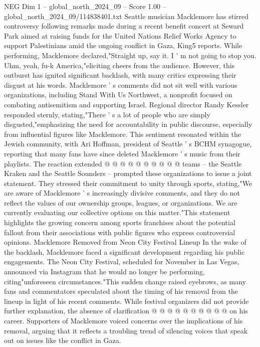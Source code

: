 \begin{textsample}{NEG Dim 1 – global\_north\_2024\_09 – Score 1.00 – global\_north\_2024\_09/114838401.txt}  \label{ex:f1_neg_362}
Seattle musician Macklemore has stirred controversy following remarks made during a recent benefit concert at Seward Park aimed at raising funds for the United Nations Relief Works Agency to support Palestinians amid the ongoing conflict in Gaza, King5 reports.
While performing, Macklemore declared,"Straight up, say it.
I ' m not going to stop you.
Uhm, yeah, fu-k America,"eliciting cheers from the audience.
However, this outburst has ignited significant backlash, with many critics expressing their disgust at his words.
Macklemore ' s comments did not sit well with various organizations, including Stand With Us Northwest, a nonprofit focused on combating antisemitism and supporting Israel.
Regional director Randy Kessler responded sternly, stating,"There ' s a lot of people who are simply disgusted,"emphasizing the need for accountability in public discourse, especially from influential figures like Macklemore.
This sentiment resonated within the Jewish community, with Ari Hoffman, president of Seattle ' s BCHM synagogue, reporting that many fans have since deleted Macklemore ' s music from their playlists.
The reaction extended @ @ @ @ @ @ @ @ @ @ teams -- the Seattle Kraken and the Seattle Sounders -- prompted these organizations to issue a joint statement.
They stressed their commitment to unity through sports, stating,"We are aware of Macklemore ' s increasingly divisive comments, and they do not reflect the values of our ownership groups, leagues, or organizations.
We are currently evaluating our collective options on this matter."This statement highlights the growing concern among sports franchises about the potential fallout from their associations with public figures who express controversial opinions.
Macklemore Removed from Neon City Festival Lineup In the wake of the backlash, Macklemore faced a significant development regarding his public engagements.
The Neon City Festival, scheduled for November in Las Vegas, announced via Instagram that he would no longer be performing, citing"unforeseen circumstances."This sudden change raised eyebrows, as many fans and commentators speculated about the timing of his removal from the lineup in light of his recent comments.
While festival organizers did not provide further explanation, the absence of clarification @ @ @ @ @ @ @ @ @ @ on his career.
Supporters of Macklemore voiced concerns over the implications of his removal, arguing that it reflects a troubling trend of silencing voices that speak out on issues like the conflict in Gaza.

\end{textsample}

